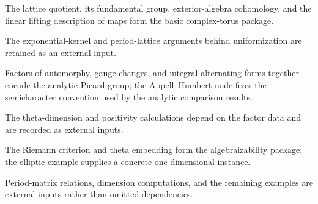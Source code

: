 \begin{remark}
\label{ch01-sec01-coverage}
The lattice quotient, its fundamental group, exterior-algebra cohomology, and
the linear lifting description of maps form the basic complex-torus package.
\notready
\end{remark}

\begin{remark}
\label{ch01-sec01-unread-results}
The exponential-kernel and period-lattice arguments behind uniformization are
retained as an external input.
\notready
\end{remark}

\begin{remark}
\label{ch01-sec02-coverage}
Factors of automorphy, gauge changes, and integral alternating forms together
encode the analytic Picard group; the Appell--Humbert node fixes the semicharacter
convention used by the analytic comparison results.
\notready
\end{remark}

\begin{remark}
\label{ch01-sec02-unread-results}
The theta-dimension and positivity calculations depend on the factor data and
are recorded as external inputs.
\notready
\end{remark}

\begin{remark}
\label{ch01-sec03-coverage}
The Riemann criterion and theta embedding form the algebraizability package;
the elliptic example supplies a concrete one-dimensional instance.
\notready
\end{remark}

\begin{remark}
\label{ch01-sec03-unread-results}
Period-matrix relations, dimension computations, and the remaining examples are
external inputs rather than omitted dependencies.
\notready
\end{remark}

